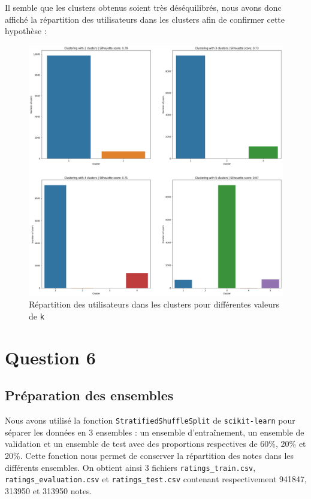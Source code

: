 \documentclass{article}
\begin{document}
Il semble que les clusters obtenus soient très déséquilibrés, nous avons donc
affiché la répartition des utilisateurs dans les clusters afin de confirmer
cette hypothèse :

\begin{figure}[ht]
  \centering
  \includegraphics[width=1\textwidth]{img/clusters_distribution.png}
  \caption{Répartition des utilisateurs dans les clusters pour différentes valeurs de \texttt{k}}
\end{figure}

\newpage
\section{Question 6}

\subsection{Préparation des ensembles}
Nous avons utilisé la fonction \texttt{StratifiedShuffleSplit} de \texttt{scikit-learn}
pour séparer les données en 3 ensembles : un ensemble d'entraînement, un ensemble
de validation et un ensemble de test avec des proportions respectives de 60\%,
20\% et 20\%.
\vskip 0.25cm
Cette fonction nous permet de conserver la répartition des notes dans les
différents ensembles.
\vskip 0.25cm
On obtient ainsi 3 fichiers \texttt{ratings\_train.csv}, \texttt{ratings\_evaluation.csv}
et \texttt{ratings\_test.csv} contenant respectivement 941847, 313950 et 313950 notes.
\end{document}
